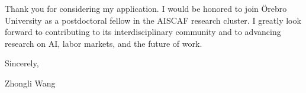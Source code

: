 \documentclass{nfr}
\begin{document}
Thank you for considering my application.
I would be honored to join Örebro University as a postdoctoral fellow in the AISCAF research cluster. 
I greatly look forward to contributing to its interdisciplinary community and to advancing research on AI, labor markets, and the future of work.
\vspace{3mm}

\noindent Sincerely,\\
\vspace{10mm}

\noindent Zhongli Wang

\vspace{5mm}




\end{document}

